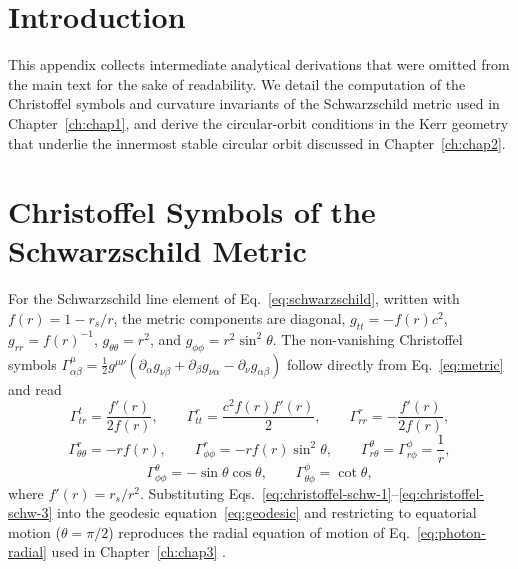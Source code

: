 \cleardoublepage
{}

\setcounter{chapter}{2} %
\setcounter{figure}{0}
\setcounter{table}{0}

\label{ann:B}

\AppendixHeader

\section*{Introduction}

This appendix collects intermediate analytical derivations that were omitted from the main text for the sake of readability. We detail the computation of the Christoffel symbols and curvature invariants of the Schwarzschild metric used in Chapter~\ref{ch:chap1}, and derive the circular-orbit conditions in the Kerr geometry that underlie the innermost stable circular orbit discussed in Chapter~\ref{ch:chap2}.

\section*{Christoffel Symbols of the Schwarzschild Metric}

For the Schwarzschild line element of Eq.~\eqref{eq:schwarzschild}, written with $f(r) = 1 - r_s/r$, the metric components are diagonal, $g_{tt}=-f(r)c^2$, $g_{rr}=f(r)^{-1}$, $g_{\theta\theta}=r^2$, and $g_{\phi\phi}=r^2\sin^2\theta$. The non-vanishing Christoffel symbols $\Gamma^{\mu}_{\alpha\beta} = \tfrac{1}{2}g^{\mu\nu}\left(\partial_\alpha g_{\nu\beta} + \partial_\beta g_{\nu\alpha} - \partial_\nu g_{\alpha\beta}\right)$ follow directly from Eq.~\eqref{eq:metric} and read \cite{wald1984}
\begin{equation}
	\Gamma^{t}_{tr} = \frac{f'(r)}{2f(r)}, \qquad
	\Gamma^{r}_{tt} = \frac{c^2 f(r) f'(r)}{2}, \qquad
	\Gamma^{r}_{rr} = -\frac{f'(r)}{2f(r)},
	\label{eq:christoffel-schw-1}
\end{equation}
\begin{equation}
	\Gamma^{r}_{\theta\theta} = -r f(r), \qquad
	\Gamma^{r}_{\phi\phi} = -r f(r) \sin^2\theta, \qquad
	\Gamma^{\theta}_{r\theta} = \Gamma^{\phi}_{r\phi} = \frac{1}{r},
	\label{eq:christoffel-schw-2}
\end{equation}
\begin{equation}
	\Gamma^{\theta}_{\phi\phi} = -\sin\theta\cos\theta, \qquad
	\Gamma^{\phi}_{\theta\phi} = \cot\theta,
	\label{eq:christoffel-schw-3}
\end{equation}
where $f'(r)=r_s/r^2$. Substituting Eqs.~\eqref{eq:christoffel-schw-1}--\eqref{eq:christoffel-schw-3} into the geodesic equation~\eqref{eq:geodesic} and restricting to equatorial motion ($\theta=\pi/2$) reproduces the radial equation of motion of Eq.~\eqref{eq:photon-radial} used in Chapter~\ref{ch:chap3} \cite{hartle2003}.

